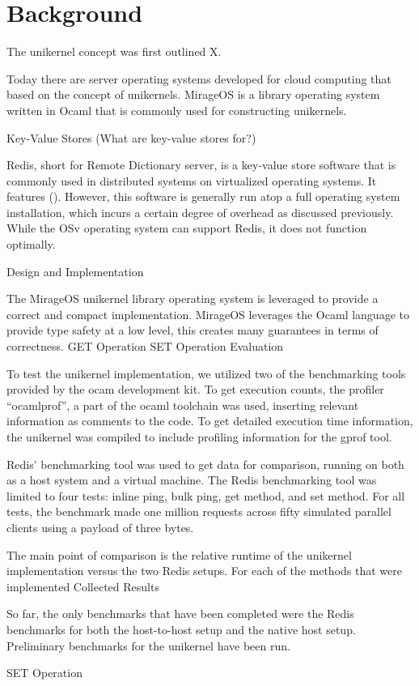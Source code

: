 \documentclass[english,10pt,twocolumn]{article}
\begin{document}
\section{Background}
  The unikernel concept was first outlined X.

Today there are server operating systems developed for cloud computing that based on the concept of unikernels. MirageOS is a library operating system written in Ocaml that is commonly used for constructing unikernels.

Key-Value Stores
(What are key-value stores for?) 

Redis, short for Remote Dictionary server, is a key-value store software that is commonly used in distributed systems on virtualized operating systems. It features (). However, this software is generally run atop a full operating system installation, which incurs a certain degree of overhead as discussed previously.  While the OSv operating system can support Redis, it does not function optimally.

Design and Implementation

The MirageOS unikernel library operating system is leveraged to provide a correct and compact implementation. MirageOS leverages the Ocaml language to provide type safety at a low level, this creates many guarantees in terms of correctness.
GET Operation
SET Operation
Evaluation

To test the unikernel implementation, we utilized two of the benchmarking tools provided by the  ocam development kit. To get execution counts, the profiler “ocamlprof”, a part of the ocaml toolchain was used, inserting relevant information as comments to the code. To get detailed execution time information, the unikernel was compiled to include profiling information for the gprof tool.

Redis’ benchmarking tool was used to get data for comparison, running on both as a host system and a virtual machine. The Redis benchmarking tool was limited to four tests: inline ping, bulk ping, get method, and set method. For all tests, the benchmark made one million requests across fifty simulated parallel clients using a payload of three bytes.

The main point of comparison is the relative runtime of the unikernel implementation versus the two Redis setups. For each of the methods that were implemented
Collected Results

So far, the only benchmarks that have been completed were the Redis benchmarks for both the host-to-host setup and the native host setup. Preliminary benchmarks for the unikernel have been run.

SET Operation



\nocite{*}


\end{document}
